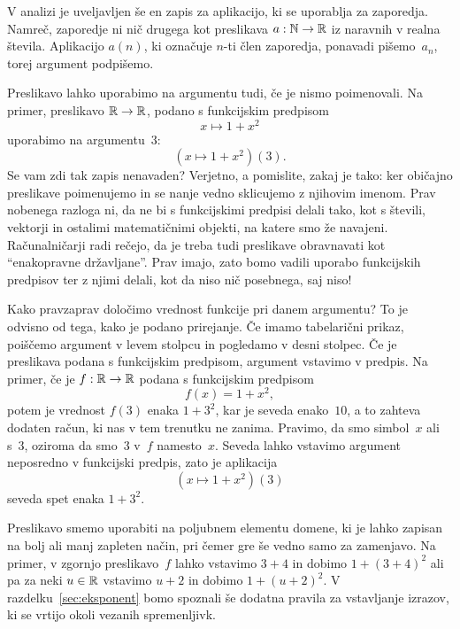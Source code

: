 V analizi je uveljavljen še en zapis za aplikacijo, ki se uporablja za zaporedja. Namreč,
zaporedje ni nič drugega kot preslikava $a : \mathbb{N} \to \mathbb{R}$ iz naravnih v realna števila.
Aplikacijo $a(n)$, ki označuje $n$-ti člen zaporedja, ponavadi pišemo~$a_n$, torej
argument podpišemo.

Preslikavo lahko uporabimo na argumentu tudi, če je nismo poimenovali. Na primer,
preslikavo $\mathbb{R} \to \mathbb{R}$, podano s funkcijskim predpisom
%
\begin{equation*}
  x \mapsto 1 + x^2
\end{equation*}
%
uporabimo na argumentu~$3$:
%
\begin{equation*}
  (x \mapsto 1 + x^2)(3).
\end{equation*}
%
Se vam zdi tak zapis nenavaden? Verjetno, a pomislite, zakaj je tako: ker običajno
preslikave poimenujemo in se nanje vedno sklicujemo z njihovim imenom. Prav nobenega
razloga ni, da ne bi s funkcijskimi predpisi delali tako, kot s števili, vektorji in
ostalimi matematičnimi objekti, na katere smo že navajeni. Računalničarji radi rečejo, da
je treba tudi preslikave obravnavati kot ``enakopravne državljane''. Prav imajo, zato
bomo vadili uporabo funkcijskih predpisov ter z njimi delali, kot da niso nič posebnega,
saj niso!

Kako pravzaprav določimo vrednost funkcije pri danem argumentu? To je odvisno od tega,
kako je podano prirejanje. Če imamo tabelarični prikaz, poiščemo argument v levem stolpcu
in pogledamo v desni stolpec. Če je preslikava podana s funkcijskim predpisom, argument
vstavimo v predpis. Na primer, če je $f : \mathbb{R} \to \mathbb{R}$ podana s funkcijskim predpisom
%
\begin{equation*}
  f(x) = 1 + x^2,
\end{equation*}
%
potem je vrednost $f(3)$ enaka $1 + 3^2$, kar je seveda enako~$10$, a to zahteva dodaten
račun, ki nas v tem trenutku ne zanima. Pravimo, da smo simbol~$x$  ali
 s~$3$, oziroma da smo~$3$  v~$f$ namesto~$x$. Seveda lahko
vstavimo argument neposredno v funkcijski predpis, zato je aplikacija
%
\begin{equation*}
  (x \mapsto 1 + x^2)(3)
\end{equation*}
%
seveda spet enaka $1 + 3^2$.

Preslikavo smemo uporabiti na poljubnem elementu domene, ki je lahko zapisan na bolj ali
manj zapleten način, pri čemer gre še vedno samo za zamenjavo. Na primer, v zgornjo
preslikavo~$f$ lahko vstavimo $3 + 4$ in dobimo $1 + (3 + 4)^2$ ali pa za neki $u \in \mathbb{R}$
vstavimo $u + 2$ in dobimo $1 + (u + 2)^2$. V razdelku~\ref{sec:eksponent} bomo spoznali
še dodatna pravila za vstavljanje izrazov, ki se vrtijo okoli vezanih spremenljivk.


